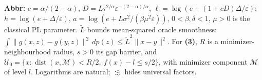\begin{table}[tp]
\begin{threeparttable}
\begin{tablenotes}[flushleft]
\item[] \textbf{Abbr:} $c=\alpha/(2-\alpha)$, $D=L\tau^{2/\alpha}\varepsilon^{-(2-\alpha)/\alpha}$, $\ell=\log(e+(1+cD)\Delta/\varepsilon)$; $h=\log(e+\Delta/\varepsilon)$, $a=\log(e+L\sigma^2/(\beta\mu^2\varepsilon))$, $0<\beta,\delta<1$, $\mu>0$ is the classical PL parameter. $\widetilde L$ bounds mean-squared oracle smoothness: $\int\|g(x,z)-g(y,z)\|^2\,dp(z)\le\widetilde L^2\|x-y\|^2$. For \textbf{(3)}, $R$ is a minimizer-neighbourhood radius, $s>0$ its gap barrier, and $\mathcal U_0=\{x:\operatorname{dist}(x,\mathcal M)<R/2,\ f(x)-l\le s/2\}$, with minimizer component $\mathcal M$ of level $l$. Logarithms are natural; $\lesssim$ hides universal factors.
\end{tablenotes}
\end{threeparttable}
\end{table}
\clearpage
